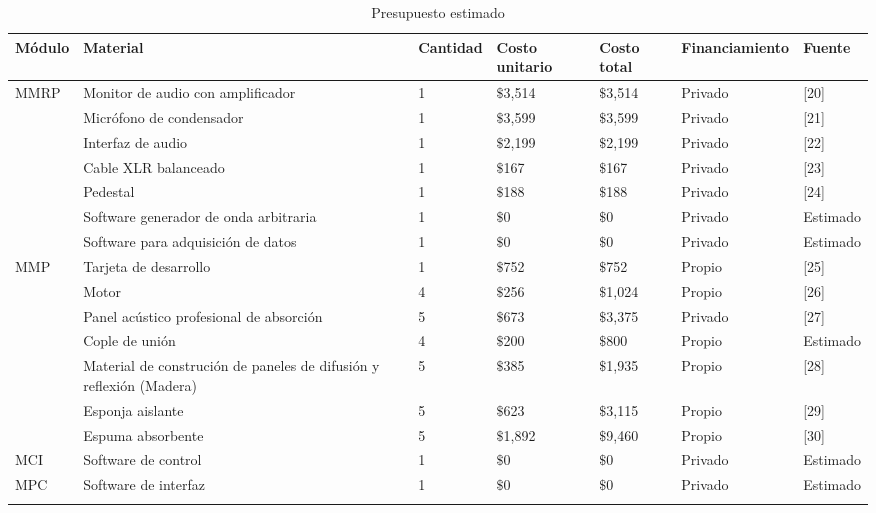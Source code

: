 \documentclass[letterpaper,12pt,oneside]{article}
\begin{document}
\begin{center}
\scriptsize
    \begin{longtable}[!htb]{| m{4em} | m{8em} | m{4.5em}| m{4em}| m{3em}| m{8em}| m{4em}|}
    \hline
    \textbf{M\'odulo}& \textbf{Material} & \textbf{Cantidad} & \textbf{Costo unitario} & \textbf{Costo total} & \textbf{Financiamiento} & \textbf{Fuente}\\
    \hline\hline
    \multirow{7}{*}{MMRP} 
    & Monitor de audio con amplificador & 1 & $\$$3,514 & $\$$3,514 & Privado & [20]\\
    \cline{2-7}
    & Micr\'ofono de condensador & 1 & $\$$3,599 & $\$$3,599 & Privado & [21]\\
    \cline{2-7}
    & Interfaz de audio & 1 & $\$$2,199 & $\$$2,199 & Privado & [22]\\
    \cline{2-7}
    & Cable XLR balanceado & 1 & $\$$167 & $\$$167 & Privado & [23]\\
    \cline{2-7}
    & Pedestal & 1 & $\$$188 & $\$$188 & Privado & [24]\\
    \cline{2-7}
    & Software generador de onda arbitraria & 1 & $\$$0 & $\$$0 & Privado & Estimado\\
    \cline{2-7}
    & Software para adquisici\'on de datos & 1 & $\$$0 & $\$$0 & Privado & Estimado\\
    \hline

    \multirow{5}{*}{MMP} 
    & Tarjeta de desarrollo & 1 & $\$$752 & $\$$752 & Propio & [25]\\
    \cline{2-7}
    & Motor & 4 & $\$$256 & $\$$1,024 & Propio & [26]\\
    \cline{2-7}
    & Panel ac\'ustico profesional de absorci\'on & 5 & $\$$673 & $\$$3,375 & Privado & [27]\\
    \cline{2-7}
    & Cople de uni\'on  & 4 & $\$$200 & $\$$800 & Propio & Estimado\\
    \cline{2-7}
    & Material de construci\'on de paneles de difusi\'on  y reflexi\'on (Madera) & 5 & $\$$385 & $\$$1,935 & Propio & [28]\\
    \hline

    & Esponja aislante & 5 & $\$$623 & $\$$3,115 & Propio & [29]\\
    \hline
    
    & Espuma absorbente & 5 & $\$$1,892 & $\$$9,460 & Propio & [30]\\
    \hline

    MCI & Software de control  & 1 & $\$$0 & $\$$0 & Privado & Estimado\\
    \hline
    MPC & Software de interfaz & 1 & $\$$0 & $\$$0 & Privado & Estimado\\
    \hline
    
    \caption{Presupuesto estimado}
    \label{tab:Presupuesto}
    \end{longtable}
\end{center}
\end{document}
